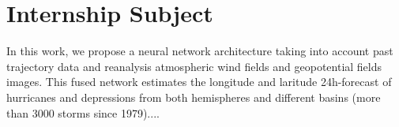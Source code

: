 \section{Internship Subject}
\label{sec:subject}
In this work, we propose a neural network architecture taking into account past trajectory data and reanalysis atmospheric wind fields and geopotential fields images. This fused network estimates the longitude and laritude 24h-forecast of hurricanes and depressions from both hemispheres and different basins (more than 3000 storms since 1979)....


